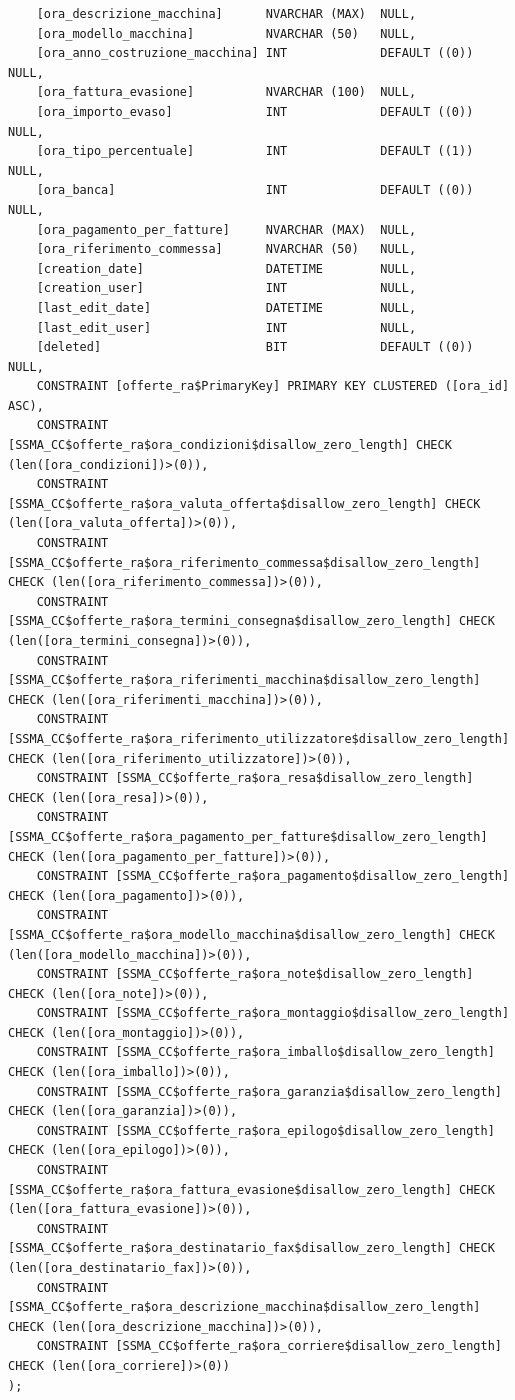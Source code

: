 \documentclass[12pt]{article}
\begin{document}
\begin{lstlisting}
    [ora_descrizione_macchina]      NVARCHAR (MAX)  NULL,
    [ora_modello_macchina]          NVARCHAR (50)   NULL,
    [ora_anno_costruzione_macchina] INT             DEFAULT ((0)) NULL,
    [ora_fattura_evasione]          NVARCHAR (100)  NULL,
    [ora_importo_evaso]             INT             DEFAULT ((0)) NULL,
    [ora_tipo_percentuale]          INT             DEFAULT ((1)) NULL,
    [ora_banca]                     INT             DEFAULT ((0)) NULL,
    [ora_pagamento_per_fatture]     NVARCHAR (MAX)  NULL,
    [ora_riferimento_commessa]      NVARCHAR (50)   NULL,
    [creation_date]                 DATETIME        NULL,
    [creation_user]                 INT             NULL,
    [last_edit_date]                DATETIME        NULL,
    [last_edit_user]                INT             NULL,
    [deleted]                       BIT             DEFAULT ((0)) NULL,
    CONSTRAINT [offerte_ra$PrimaryKey] PRIMARY KEY CLUSTERED ([ora_id] ASC),
    CONSTRAINT [SSMA_CC$offerte_ra$ora_condizioni$disallow_zero_length] CHECK (len([ora_condizioni])>(0)),
    CONSTRAINT [SSMA_CC$offerte_ra$ora_valuta_offerta$disallow_zero_length] CHECK (len([ora_valuta_offerta])>(0)),
    CONSTRAINT [SSMA_CC$offerte_ra$ora_riferimento_commessa$disallow_zero_length] CHECK (len([ora_riferimento_commessa])>(0)),
    CONSTRAINT [SSMA_CC$offerte_ra$ora_termini_consegna$disallow_zero_length] CHECK (len([ora_termini_consegna])>(0)),
    CONSTRAINT [SSMA_CC$offerte_ra$ora_riferimenti_macchina$disallow_zero_length] CHECK (len([ora_riferimenti_macchina])>(0)),
    CONSTRAINT [SSMA_CC$offerte_ra$ora_riferimento_utilizzatore$disallow_zero_length] CHECK (len([ora_riferimento_utilizzatore])>(0)),
    CONSTRAINT [SSMA_CC$offerte_ra$ora_resa$disallow_zero_length] CHECK (len([ora_resa])>(0)),
    CONSTRAINT [SSMA_CC$offerte_ra$ora_pagamento_per_fatture$disallow_zero_length] CHECK (len([ora_pagamento_per_fatture])>(0)),
    CONSTRAINT [SSMA_CC$offerte_ra$ora_pagamento$disallow_zero_length] CHECK (len([ora_pagamento])>(0)),
    CONSTRAINT [SSMA_CC$offerte_ra$ora_modello_macchina$disallow_zero_length] CHECK (len([ora_modello_macchina])>(0)),
    CONSTRAINT [SSMA_CC$offerte_ra$ora_note$disallow_zero_length] CHECK (len([ora_note])>(0)),
    CONSTRAINT [SSMA_CC$offerte_ra$ora_montaggio$disallow_zero_length] CHECK (len([ora_montaggio])>(0)),
    CONSTRAINT [SSMA_CC$offerte_ra$ora_imballo$disallow_zero_length] CHECK (len([ora_imballo])>(0)),
    CONSTRAINT [SSMA_CC$offerte_ra$ora_garanzia$disallow_zero_length] CHECK (len([ora_garanzia])>(0)),
    CONSTRAINT [SSMA_CC$offerte_ra$ora_epilogo$disallow_zero_length] CHECK (len([ora_epilogo])>(0)),
    CONSTRAINT [SSMA_CC$offerte_ra$ora_fattura_evasione$disallow_zero_length] CHECK (len([ora_fattura_evasione])>(0)),
    CONSTRAINT [SSMA_CC$offerte_ra$ora_destinatario_fax$disallow_zero_length] CHECK (len([ora_destinatario_fax])>(0)),
    CONSTRAINT [SSMA_CC$offerte_ra$ora_descrizione_macchina$disallow_zero_length] CHECK (len([ora_descrizione_macchina])>(0)),
    CONSTRAINT [SSMA_CC$offerte_ra$ora_corriere$disallow_zero_length] CHECK (len([ora_corriere])>(0))
);


\end{lstlisting}
\end{document}
